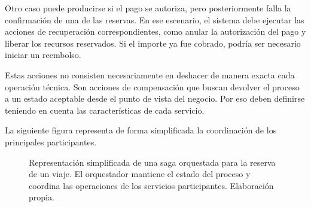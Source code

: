 Otro caso puede producirse si el pago se autoriza, pero posteriormente falla la confirmación de una de las reservas. En ese escenario, el sistema debe ejecutar las acciones de recuperación correspondientes, como anular la autorización del pago y liberar los recursos reservados. Si el importe ya fue cobrado, podría ser necesario iniciar un reembolso.

Estas acciones no consisten necesariamente en deshacer de manera exacta cada operación técnica. Son acciones de compensación que buscan devolver el proceso a un estado aceptable desde el punto de vista del negocio. Por eso deben definirse teniendo en cuenta las características de cada servicio.

La siguiente figura representa de forma simplificada la coordinación de los principales participantes.

\begin{figure}[H]
    \centering
    \caption{Representación simplificada de una saga orquestada para la reserva de un viaje. El orquestador mantiene el estado del proceso y coordina las operaciones de los servicios participantes. Elaboración propia.}
    \label{fig:saga-reserva}
\end{figure}


